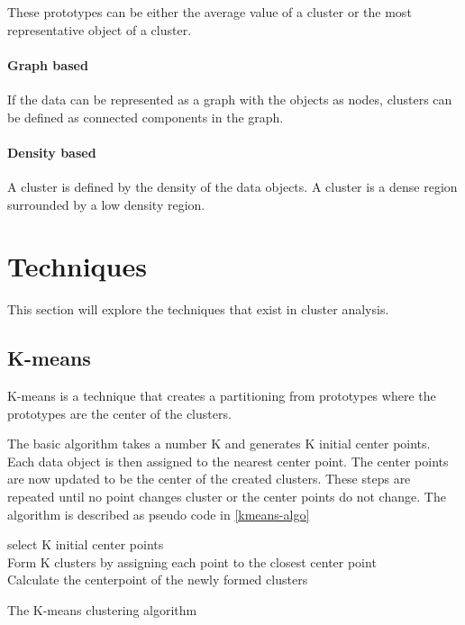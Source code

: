 These prototypes can be either the average value of a cluster or the most representative object of a cluster.

\paragraph{Graph based}
If the data can be represented as a graph with the objects as nodes, clusters can be defined as connected components in the graph.

\paragraph{Density based}
A cluster is defined by the density of the data objects.
A cluster is a dense region surrounded by a low density region.

\section{Techniques}

This section will explore the techniques that exist in cluster analysis.

\subsection{K-means}

K-means is a technique that creates a partitioning from prototypes where the prototypes are the center of the clusters.

The basic algorithm takes a number K and generates K initial center points.
Each data object is then assigned to the nearest center point.
The center points are now updated to be the center of the created clusters.
These steps are repeated until no point changes cluster or the center points do not change.
The algorithm is described as pseudo code in \cref{kmeans-algo}

\begin{algorithm}
\SetAlgoLined
{}

select K initial center points \\
 {
Form K clusters by assigning each point to the closest center point \\
Calculate the centerpoint of the newly formed clusters \label{recalculate}\\
}
\caption{The K-means clustering algorithm}\label{kmeans-algo}
\end{algorithm}

